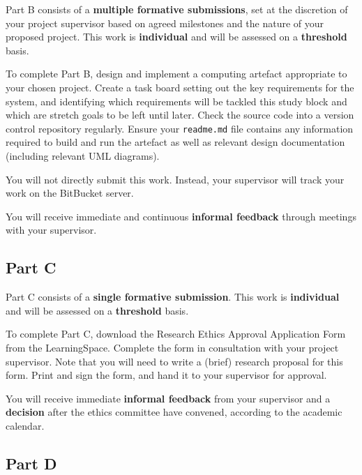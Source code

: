 Part B consists of a \textbf{multiple formative submissions},
set at the discretion of your project supervisor based on agreed milestones and the nature of your proposed project.
This work is \textbf{individual} and will be assessed on a \textbf{threshold} basis.

To complete Part B, design and implement a computing artefact appropriate to your chosen project.
Create a task board setting out the key requirements for the system,
and identifying which requirements will be tackled this study block
and which are stretch goals to be left until later.
Check the source code into a version control repository regularly.
Ensure your \texttt{readme.md} file contains any information required to build and run the artefact as well as
relevant design documentation (including relevant UML diagrams).

You will not directly submit this work. Instead, your supervisor will track your work on the BitBucket server.

You will receive immediate and continuous \textbf{informal feedback} through meetings with your supervisor.


\subsection*{Part C}

Part C consists of a \textbf{single formative submission}.
This work is \textbf{individual} and will be assessed on a \textbf{threshold} basis.

To complete Part C, download the Research Ethics Approval Application Form
from the LearningSpace. Complete the form in consultation with your project supervisor.
Note that you will need to write a (brief) research proposal for this form. Print and sign the form, 
and hand it to your supervisor for approval.

You will receive immediate \textbf{informal feedback} from your supervisor and a \textbf{decision} 
after the ethics committee have convened, according to the academic calendar.

\subsection*{Part D}


